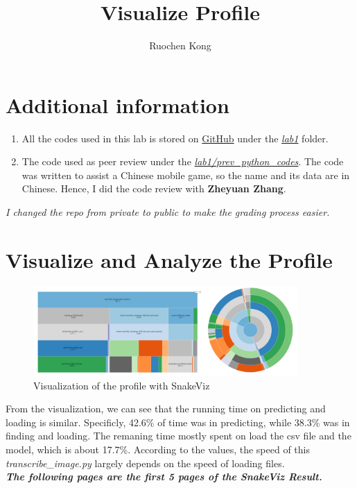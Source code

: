 \documentclass[11pt]{article}
\title{Visualize Profile}
\author{Ruochen Kong}
\date{}
\begin{document}
\maketitle{}
\section{Additional information}
\begin{enumerate}
	\item All the codes used in this lab is stored on \href{https://github.com/RuochenKong/BMI500Labs}{GitHub} under the \href{https://github.com/RuochenKong/BMI500Labs/tree/master/lab1}{\textit{lab1}} folder.
	\item The code used as peer review under the \href{https://github.com/RuochenKong/BMI500Labs/tree/master/lab1/prev_python_codes}{\textit{lab1/prev\_python\_codes}}. The code was written to assist a Chinese mobile game, so the name and its data are in Chinese. Hence, I did the code review with \textbf{Zheyuan Zhang}.
\end{enumerate}
\textit{I changed the repo from private to public to make the grading process easier.}

\section{Visualize and Analyze the Profile}

	\begin{figure}[h]
		\centering
		\includegraphics[width=0.9\textwidth]{prof_viz.png}
		\caption{Visualization of the profile with SnakeViz}
		\label{fig:viz}
	\end{figure}

	From the visualization, we can see that the running time on predicting and loading is similar. Specificly, 42.6\% of time was in predicting, while 38.3\% was in finding and loading. The remaning time mostly spent on load the csv file and the model, which is about 17.7\%. According to the values, the speed of this \textit{transcribe\_image.py} largely depends on the speed of loading files.\\

	\textbf{\textit{The following pages are the first 5 pages of the SnakeViz Result.}}

\newpage

\end{document}
